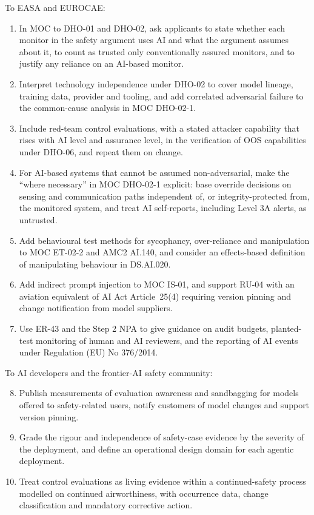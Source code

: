 \documentclass{aer}
\begin{document}
To EASA and EUROCAE:

\begin{enumerate}
\item In MOC to DHO-01 and DHO-02, ask applicants to state whether each monitor in the safety argument uses AI and what the argument assumes about it, to count as trusted only conventionally assured monitors, and to justify any reliance on an AI-based monitor.
\item Interpret technology independence under DHO-02 to cover model lineage, training data, provider and tooling, and add correlated adversarial failure to the common-cause analysis in MOC DHO-02-1.
\item Include red-team control evaluations, with a stated attacker capability that rises with AI level and assurance level, in the verification of OOS capabilities under DHO-06, and repeat them on change.
\item For AI-based systems that cannot be assumed non-adversarial, make the ``where necessary'' in MOC DHO-02-1 explicit: base override decisions on sensing and communication paths independent of, or integrity-protected from, the monitored system, and treat AI self-reports, including Level 3A alerts, as untrusted.
\item Add behavioural test methods for sycophancy, over-reliance and manipulation to MOC ET-02-2 and AMC2 AI.140, and consider an effects-based definition of manipulating behaviour in DS.AI.020.
\item Add indirect prompt injection to MOC IS-01, and support RU-04 with an aviation equivalent of AI Act Article~25(4) requiring version pinning and change notification from model suppliers.
\item Use ER-43 and the Step 2 NPA to give guidance on audit budgets, planted-test monitoring of human and AI reviewers, and the reporting of AI events under Regulation (EU) No 376/2014.
\end{enumerate}

To AI developers and the frontier-AI safety community:

\begin{enumerate}\setcounter{enumi}{7}%
\item Publish measurements of evaluation awareness and sandbagging for models offered to safety-related users, notify customers of model changes and support version pinning.
\item Grade the rigour and independence of safety-case evidence by the severity of the deployment, and define an operational design domain for each agentic deployment.
\item Treat control evaluations as living evidence within a continued-safety process modelled on continued airworthiness, with occurrence data, change classification and mandatory corrective action.
\end{enumerate}
\end{document}

